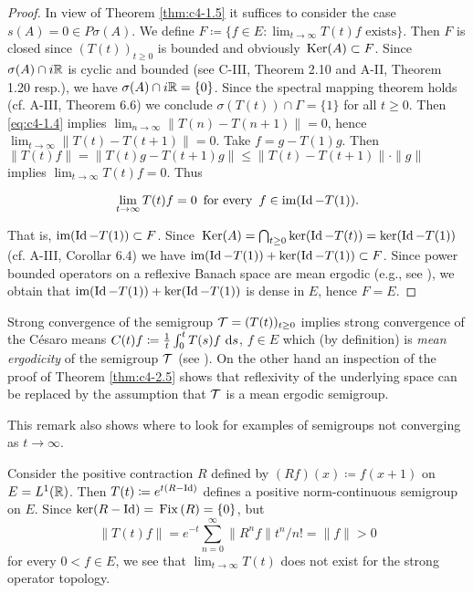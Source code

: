 \begin{proof}
In view of Theorem \ref{thm:c4-1.5} it suffices to consider the case $s(A) = 0 \in P{\sigma}(A)$.
We define $F \coloneqq \{f \in E \colon \lim_{t \to \infty} T(t)f \text{ exists}\}$.
Then $F$ is closed since $(T(t))_{t \geq 0}$ is bounded and obviously $\mathop{}\mathrm{Ker}(A) \subset F$.
Since $\sigma(A) \cap i\mathbb{R}$ is cyclic and bounded (see C-III, Theorem 2.10 and A-II, Theorem 1.20 resp.), we have $\sigma(A) \cap i\mathbb{R} = \{0\}$.
Since the spectral mapping theorem holds (cf. A-III, Theorem 6.6) we conclude $\sigma(T(t)) \cap \Gamma = \{1\}$ for all $t \geq 0$.
Then \ref{eq:c4-1.4} implies $\lim_{n \to \infty} \|T(n) - T(n+1)\| = 0$, hence $\lim_{t \to \infty}\|T(t) - T(t+1)\| = 0$.
Take $f = g - T(1)g$.
Then $\|T(t)f\| = \|T(t)g - T(t+1)g\| \leq \|T(t) - T(t+1)\| \cdot \|g\|$ implies $\lim_{t \to \infty} T(t)f = 0$.
Thus

\begin{equation}\label{eq:c4-2.5}
\lim_{t \to \infty} T(t)f = 0\, \text{ for every }\, f \in \text{im}(\operatorname{Id} - T(1)).
\end{equation}

That is, $\text{im}(\operatorname{Id} - T(1)) \subset F$.
Since $\mathop{}\mathrm{Ker}(A) = \bigcap_{t \geq 0} \ker(\operatorname{Id} - T(t)) = \ker(\operatorname{Id} - T(1))$ (cf. A-III, Corollar 6.4) we have $\text{im}(\operatorname{Id} - T(1)) + \ker(\operatorname{Id} - T(1)) \subset F$.
Since power bounded operators on a reflexive Banach space are mean ergodic (e.g., see \citet[Chapter 2, Theorem 1.2]{krengel:1985}), we obtain that $\text{im}(\operatorname{Id} - T(1)) + \ker(\operatorname{Id} - T(1))$ is dense in $E$, hence $F = E$.
\end{proof}

Strong convergence of the semigroup $\mathcal{T} = (T(t))_{t \geq 0}$ implies strong convergence of the Césaro means $C(t)f \coloneqq  \frac{1}{t}\int_{0}^{t} T(s)f \, \mathop{}\!\mathrm{d}{s}$, $f \in E$ which (by definition) is \emph{mean ergodicity} of the semigroup $\mathcal{T}$ (see \citet[Chap.5.1]{davies:1980}).
On the other hand an inspection of the proof of Theorem \ref{thm:c4-2.5} shows that reflexivity of the underlying space can be replaced by the assumption that $\mathcal{T}$ is a mean ergodic semigroup.

This remark also shows where to look for examples of semigroups not converging as $t \to \infty$.

Consider the positive contraction $R$ defined by $(Rf)(x) \coloneqq f(x+1)$ on $E = L^{1}(\mathbb{R})$.
Then $T(t) \coloneqq e^{t(R-\operatorname{Id})}$ defines a positive norm-continuous semigroup on $E$.
Since $\ker(R - \operatorname{Id}) = \mathop{}\mathrm{Fix}\left(R\right) = \{0\}$, but 
\[
\|T(t)f\| = e^{-t}\sum_{n=0}^{\infty} \|R^{n}f\|t^{n}/n! = \|f\| > 0
\] 
for every $0 < f \in E$, we see that $\lim_{t\to\infty} T(t)$ does not exist for the strong operator topology.


